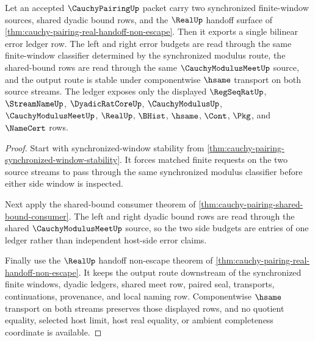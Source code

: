 \begin{theorem}
\label{thm:cauchy-pairing-bilinear-error-ledger}
Let an accepted $\CauchyPairingUp$ packet carry two synchronized finite-window sources, shared dyadic bound rows, and the $\RealUp$ handoff surface of \autoref{thm:cauchy-pairing-real-handoff-non-escape}. Then it exports a single bilinear error ledger row. The left and right error budgets are read through the same finite-window classifier determined by the synchronized modulus route, the shared-bound rows are read through the same $\CauchyModulusMeetUp$ source, and the output route is stable under componentwise $\hsame$ transport on both source streams. The ledger exposes only the displayed $\RegSeqRatUp$, $\StreamNameUp$, $\DyadicRatCoreUp$, $\CauchyModulusUp$, $\CauchyModulusMeetUp$, $\RealUp$, $\BHist$, $\hsame$, $\Cont$, $\Pkg$, and $\NameCert$ rows.
\end{theorem}
\begin{proof}
Start with synchronized-window stability from \autoref{thm:cauchy-pairing-synchronized-window-stability}. It forces matched finite requests on the two source streams to pass through the same synchronized modulus classifier before either side window is inspected.

Next apply the shared-bound consumer theorem of \autoref{thm:cauchy-pairing-shared-bound-consumer}. The left and right dyadic bound rows are read through the shared $\CauchyModulusMeetUp$ source, so the two side budgets are entries of one ledger rather than independent host-side error claims.

Finally use the $\RealUp$ handoff non-escape theorem of \autoref{thm:cauchy-pairing-real-handoff-non-escape}. It keeps the output route downstream of the synchronized finite windows, dyadic ledgers, shared meet row, paired seal, transports, continuations, provenance, and local naming row. Componentwise $\hsame$ transport on both streams preserves those displayed rows, and no quotient equality, selected host limit, host real equality, or ambient completeness coordinate is available.
\end{proof}

